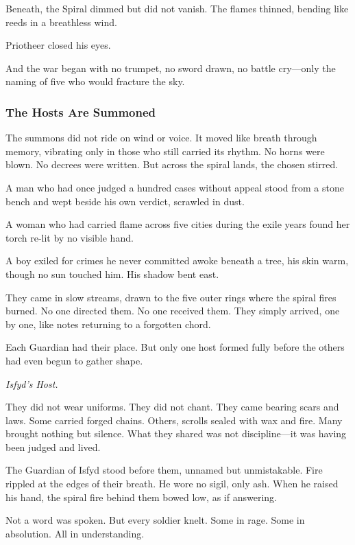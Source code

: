 \documentclass[12pt]{article}
\begin{document}
Beneath, the Spiral dimmed but did not vanish. The flames thinned, bending like reeds in a breathless wind.

Priotheer closed his eyes.

And the war began with no trumpet, no sword drawn, no battle cry—only the naming of five who would fracture the sky.


\dotfill

\subsubsection*{The Hosts Are Summoned}

The summons did not ride on wind or voice. It moved like breath through memory, vibrating only in those who still carried its rhythm. No horns were blown. No decrees were written. But across the spiral lands, the chosen stirred.

A man who had once judged a hundred cases without appeal stood from a stone bench and wept beside his own verdict, scrawled in dust.

A woman who had carried flame across five cities during the exile years found her torch re-lit by no visible hand.

A boy exiled for crimes he never committed awoke beneath a tree, his skin warm, though no sun touched him. His shadow bent east.

They came in slow streams, drawn to the five outer rings where the spiral fires burned. No one directed them. No one received them. They simply arrived, one by one, like notes returning to a forgotten chord.

Each Guardian had their place. But only one host formed fully before the others had even begun to gather shape.

\textit{Isfyd’s Host.}

They did not wear uniforms. They did not chant. They came bearing scars and laws. Some carried forged chains. Others, scrolls sealed with wax and fire. Many brought nothing but silence. What they shared was not discipline—it was having been judged and lived.

The Guardian of Isfyd stood before them, unnamed but unmistakable. Fire rippled at the edges of their breath. He wore no sigil, only ash. When he raised his hand, the spiral fire behind them bowed low, as if answering.

Not a word was spoken. But every soldier knelt. Some in rage. Some in absolution. All in understanding.
\end{document}
